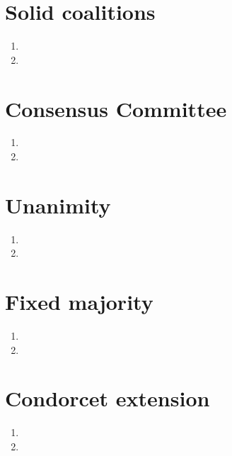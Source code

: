 \documentclass{article}
\begin{document}
\section{Solid coalitions}
\begin{enumerate}
\item 
\item 
\end{enumerate}

\section{Consensus Committee}
\begin{enumerate}
\item 
\item 
\end{enumerate}

\section{Unanimity}
\begin{enumerate}
\item 
\item 
\end{enumerate}

\section{Fixed majority}
\begin{enumerate}
\item 
\item 
\end{enumerate}

\section{Condorcet extension}
\begin{enumerate}
\item 
\item 
\end{enumerate}
\end{document}
